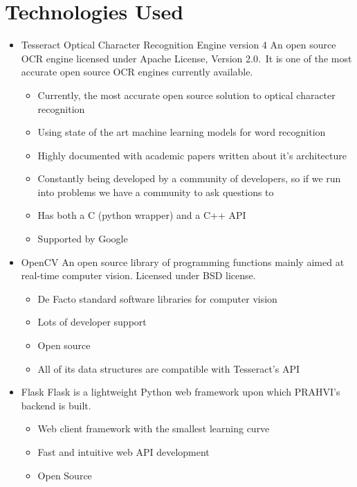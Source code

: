 	\section{Technologies Used}
		\begin{itemize}
			\item Tesseract Optical Character Recognition Engine version 4
			An open source OCR engine licensed under Apache License, Version 2.0.\footnotemark~It is one of the most accurate open source OCR engines currently available.
			
			\begin{itemize}
				\item Currently, the most accurate open source solution to optical character recognition
				\item Using state of the art machine learning models for word recognition
				\item Highly documented with academic papers written about it’s architecture
				\item Constantly being developed by a community of developers, so if we run into problems we have a community to ask questions to
				\item Has both a C (python wrapper) and a C++ API
				\item Supported by Google
			\end{itemize}

			\item OpenCV
			An open source library of programming functions mainly aimed at real-time computer vision. Licensed under BSD license.\footnotemark
			\begin{itemize}
				\item De Facto standard software libraries for computer vision
				\item Lots of developer support
				\item Open source
				\item All of its data structures are compatible with Tesseract's API
			\end{itemize}
			
			\item Flask
			Flask is a lightweight Python web framework upon which PRAHVI's backend is built.
			\begin{itemize}
				\item Web client framework with the smallest learning curve
				\item Fast and intuitive web API development
				\item Open Source
			\end{itemize}


\end{itemize}
